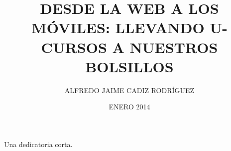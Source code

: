 \documentclass[upright, contnum]{umemoria}
\author{ALFREDO JAIME CADIZ RODRÍGUEZ}
\title{DESDE LA WEB A LOS MÓVILES: LLEVANDO U-CURSOS A NUESTROS BOLSILLOS}
\date{ENERO 2014}
\begin{document}
\frontmatter
\maketitle

\begin{abstract}
\lipsum[1-4]
\end{abstract}

\begin{dedicatoria}
Una dedicatoria corta.
\end{dedicatoria}

\begin{thanks}
\lipsum[1-2]
\end{thanks}

\cleardoublepage
\tableofcontents
\cleardoublepage
\listoftables
\cleardoublepage
\listoffigures

\mainmatter






\nocite{*}


\end{document}

